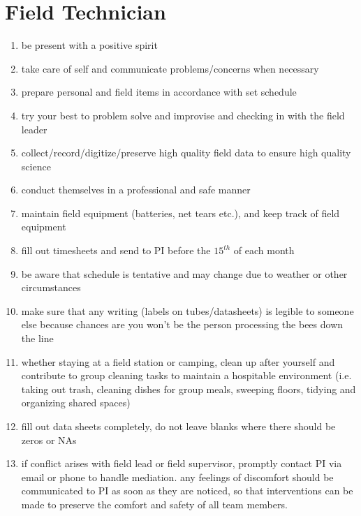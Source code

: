 \documentclass[12pt]{article}
\begin{document}
\section{Field Technician}
\begin{enumerate}
\item be present with a positive spirit
\item take care of self and communicate problems/concerns when
  necessary
\item prepare personal and field items in accordance with set schedule
\item try your best to problem solve and improvise and checking in
  with the field leader
\item collect/record/digitize/preserve high quality field data to
  ensure high quality science
\item conduct themselves in a professional and safe manner
\item maintain field equipment (batteries, net tears etc.), and keep
  track of field equipment
\item fill out timesheets and send to PI before the $15^{th}$ of each month
\item be aware that schedule is tentative and may change due to weather or other circumstances 
\item make sure that any writing (labels on tubes/datasheets) is legible to someone else because chances are you won't be the person processing the bees down the line 
\item whether staying at a field station or camping, clean up after yourself and contribute to group cleaning tasks to maintain a hospitable environment (i.e. taking out trash, cleaning dishes for group meals, sweeping floors, tidying and organizing shared spaces)
\item fill out data sheets completely, do not leave blanks where there should be zeros or NAs
\item if conflict arises with field lead or field supervisor, promptly contact PI via email or phone to handle mediation. any feelings of discomfort should be communicated to PI as soon as they are noticed, so that interventions can be made to preserve the comfort and safety of all team members.
\end{enumerate}
\end{document}

